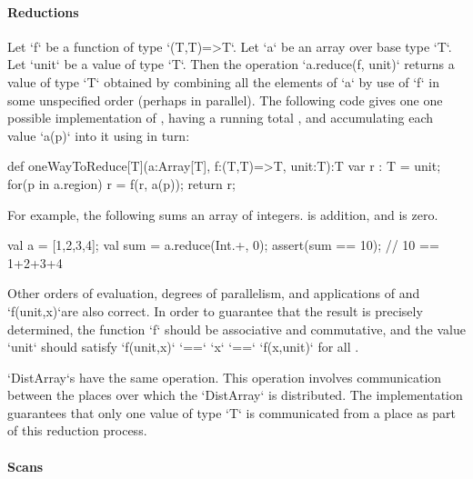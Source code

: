 \paragraph{Reductions}\label{ArrayReductions}

Let \xcd`f` be a function of type \xcd`(T,T)=>T`.  Let
\xcd`a` be an array over base type \xcd`T`.
Let \xcd`unit` be a value of type \xcd`T`.
Then the
operation \xcd`a.reduce(f, unit)` returns a value of type \xcd`T` obtained
by combining all the elements of \xcd`a` by use of  \xcd`f` in some unspecified order
(perhaps in parallel).   
The following code gives one one possible implementation of ,
having a running total , and accumulating each value \xcd`a(p)` into it
using  in turn:
\begin{xten}
def oneWayToReduce[T](a:Array[T], f:(T,T)=>T, unit:T):T {
  var r : T = unit;
  for(p in a.region) r = f(r, a(p));
  return r;
}
\end{xten}


For example,  the following sums an array of integers.   is addition,
and  is zero.  
\begin{xten}
val a = [1,2,3,4];
val sum = a.reduce(Int.+, 0); 
assert(sum == 10); // 10 == 1+2+3+4
\end{xten}

Other orders of evaluation, degrees of parallelism, and applications of
 and \xcd`f(unit,x)`are also correct.
In order to guarantee that the result is precisely
determined, the  function \xcd`f` should be associative and
commutative, and the value \xcd`unit` should satisfy
\xcd`f(unit,x)` \xcd`==` \xcd`x` \xcd`==` \xcd`f(x,unit)`
for all .  




\xcd`DistArray`s have the same operation.
This operation involves communication between the places over which
the \xcd`DistArray` is distributed. The \Xten{} implementation guarantees that
only one value of type \xcd`T` is communicated from a place as part of
this reduction process.

\paragraph{Scans}\label{ArrayScans}


